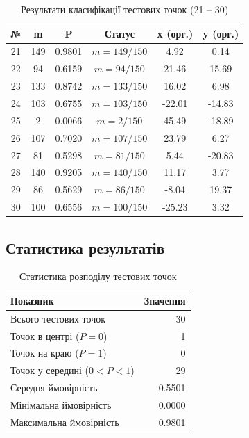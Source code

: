 \documentclass[12pt,a4paper]{article}
\begin{document}
\begin{table}[H]
\centering
\small
\begin{tabular}{|c|c|c|c|c|c|}
\toprule
\textbf{№} & \textbf{m} & \textbf{P} & \textbf{Статус} & \textbf{x (орг.)} & \textbf{y (орг.)} \\
\midrule
21 & 149 & 0.9801 & $m=149/150$ & 4.92 & 0.14 \\
22 & 94 & 0.6159 & $m=94/150$ & 21.46 & 15.69 \\
23 & 133 & 0.8742 & $m=133/150$ & 16.02 & 6.98 \\
24 & 103 & 0.6755 & $m=103/150$ & -22.01 & -14.83 \\
25 & 2 & 0.0066 & $m=2/150$ & 45.49 & -18.89 \\
26 & 107 & 0.7020 & $m=107/150$ & 23.79 & 6.27 \\
27 & 81 & 0.5298 & $m=81/150$ & 5.44 & -20.83 \\
28 & 140 & 0.9205 & $m=140/150$ & 11.17 & 3.77 \\
29 & 86 & 0.5629 & $m=86/150$ & -8.04 & 19.37 \\
30 & 100 & 0.6556 & $m=100/150$ & -25.23 & 3.32 \\
\bottomrule
\end{tabular}
\caption{Результати класифікації тестових точок (21 -- 30)}
\end{table}

\subsection{Статистика результатів}

\begin{table}[H]
\centering
\begin{tabular}{|l|r|}
\toprule
\textbf{Показник} & \textbf{Значення} \\
\midrule
Всього тестових точок & 30 \\
Точок в центрі ($P = 0$) & 1 \\
Точок на краю ($P = 1$) & 0 \\
Точок у середині ($0 < P < 1$) & 29 \\
\midrule
Середня ймовірність & 0.5501 \\
Мінімальна ймовірність & 0.0000 \\
Максимальна ймовірність & 0.9801 \\
\bottomrule
\end{tabular}
\caption{Статистика розподілу тестових точок}
\end{table}
\end{document}
